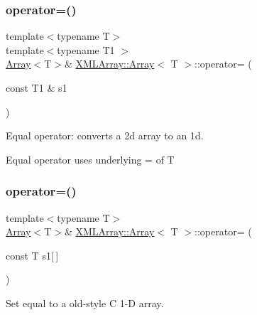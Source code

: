 \subsubsection{\texorpdfstring{operator=()}{operator=()}\hspace{0.1cm}{\footnotesize\ttfamily [6/9]}}
{\footnotesize\ttfamily template$<$typename T$>$ \\
template$<$typename T1 $>$ \\
\mbox{\hyperlink{classXMLArray_1_1Array}{Array}}$<$T$>$\& \mbox{\hyperlink{classXMLArray_1_1Array}{X\+M\+L\+Array\+::\+Array}}$<$ T $>$\+::operator= (\begin{DoxyParamCaption}\item[{const T1 \&}]{s1 }\end{DoxyParamCaption})\hspace{0.3cm}{\ttfamily [inline]}}



Equal operator\+: converts a 2d array to an 1d. 

Equal operator uses underlying = of T \mbox{\label{classXMLArray_1_1Array_a73e85fb91d2c802400fa356bc3ce77e1}} 
\subsubsection{\texorpdfstring{operator=()}{operator=()}\hspace{0.1cm}{\footnotesize\ttfamily [7/9]}}
{\footnotesize\ttfamily template$<$typename T$>$ \\
\mbox{\hyperlink{classXMLArray_1_1Array}{Array}}$<$T$>$\& \mbox{\hyperlink{classXMLArray_1_1Array}{X\+M\+L\+Array\+::\+Array}}$<$ T $>$\+::operator= (\begin{DoxyParamCaption}\item[{const T}]{s1\mbox{[}$\,$\mbox{]} }\end{DoxyParamCaption})\hspace{0.3cm}{\ttfamily [inline]}}



Set equal to a old-\/style C 1-\/D array. 

\mbox{\label{classXMLArray_1_1Array_a73e85fb91d2c802400fa356bc3ce77e1}} 
